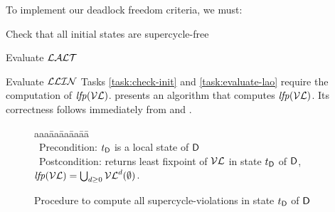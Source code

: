 To implement our deadlock freedom criteria, we must:
\bn
\item \label{task:check-init} Check that all initial states are supercycle-free
\item \label{task:evaluate-lao} Evaluate $\mathcal{LALT}$
\item \label{task:evaluate-llin} Evaluate $\mathcal{LLIN}$
\en
%
Tasks \ref{task:check-init} and \ref{task:evaluate-lao} require the computation of $\mathit{lfp}(\mathcal{VL})$.
 presents an algorithm that computes
$\mathit{lfp}(\mathcal{VL})$. Its correctness follows immediately from  and .


   \label{secn:computeLFP}
%   

\newcommand{\fpt}{\mathit{fixpoint}}
\newcommand{\VLA}[5]{\ensuremath{\MATHIDN{V_{\dsk{#1}{#2},#3} [#4 #5]}}}    %

\begin{figure}[H]
\setcounter{lctr}{0}
\begin{tabbing}\label{alg:compute-lfp}
aaa\= aa\= aa\= aa\= aa\=\kill
{}\\
\cmnt\ Precondition: $t_\mathsf{D}$ is a local state of $\mathsf{D}$\\
\cmnt\ Postcondition: returns least fixpoint of $\mathcal{VL}$ in state $t_\mathsf{D}$ of $\mathsf{D}$, \ie $\mathit{lfp}(\mathcal{VL}) = \bigcup_{d \ge 0} \mathcal{VL}^{d} (\emptyset)$.\\

\lio{\XS \gts \ewfg;}

\lio{\REPEAT}
   \lit{\XS \gts \YS}
\lio{\UNTIL\ \XS = \YS;}

\lion{\RETURNE{\XS}}
\end{tabbing}
\caption{Procedure to compute all supercycle-violations in state $t_\mathsf{D}$ of $\mathsf{D}$}
\label{fig:algcomputeLFP}
\end{figure}




